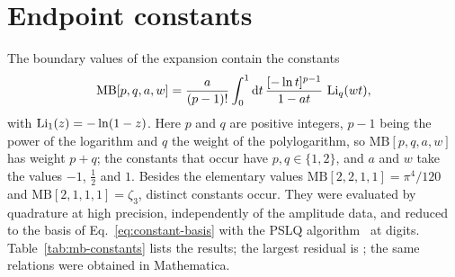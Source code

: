 \section{Endpoint constants}
\label{app:constants}

The boundary values of the expansion contain the constants
\begin{equation}
 \mathrm{MB}[p,q,a,w]
 =\frac{a}{(p-1)!}\int_0^1\mathrm{d} t\,
 \frac{[-\ln t]^{p-1}}{1-at}\,\operatorname{Li}_q(wt),
 \label{eq:mb-definition}
\end{equation}
with $\operatorname{Li}_1(z)=-\ln(1-z)$.
Here $p$ and $q$ are positive integers, $p-1$ being the power of the logarithm and $q$ the weight of the polylogarithm, so $\mathrm{MB}[p,q,a,w]$ has weight $p+q$; the constants that occur have $p,q\in\{1,2\}$, and $a$ and $w$ take the values $-1$, $\tfrac12$ and $1$.
Besides the elementary values $\mathrm{MB}[2,2,1,1]=\pi^4/120$ and $\mathrm{MB}[2,1,1,1]=\zeta_3$, \ConstantCountWord{} distinct constants occur.
They were evaluated by quadrature at high precision, independently of the amplitude data, and reduced to the basis of Eq.~\eqref{eq:constant-basis} with the PSLQ algorithm~\cite{Ferguson:1999} at \PSLQDigits{} digits. Table~\ref{tab:mb-constants} lists the results; the largest residual is \PSLQResidual; the same relations were obtained in Mathematica.
%

